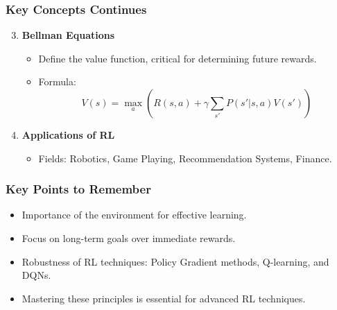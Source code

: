 \documentclass{beamer}
\begin{document}
\begin{frame}[fragile]
    \frametitle{Key Concepts Continues}
    \begin{enumerate}
        \setcounter{enumi}{2}
        \item \textbf{Bellman Equations}
            \begin{itemize}
                \item Define the value function, critical for determining future rewards.
                \item Formula: 
                \begin{equation}
                    V(s) = \max_a \left( R(s, a) + \gamma \sum_{s'} P(s' | s, a) V(s') \right)
                \end{equation}
            \end{itemize}
        \item \textbf{Applications of RL}
            \begin{itemize}
                \item Fields: Robotics, Game Playing, Recommendation Systems, Finance.
            \end{itemize}
    \end{enumerate}
\end{frame}

\begin{frame}[fragile]
    \frametitle{Key Points to Remember}
    \begin{itemize}
        \item Importance of the environment for effective learning.
        \item Focus on long-term goals over immediate rewards.
        \item Robustness of RL techniques: Policy Gradient methods, Q-learning, and DQNs.
        \item Mastering these principles is essential for advanced RL techniques.
    \end{itemize}
\end{frame}
\end{document}
